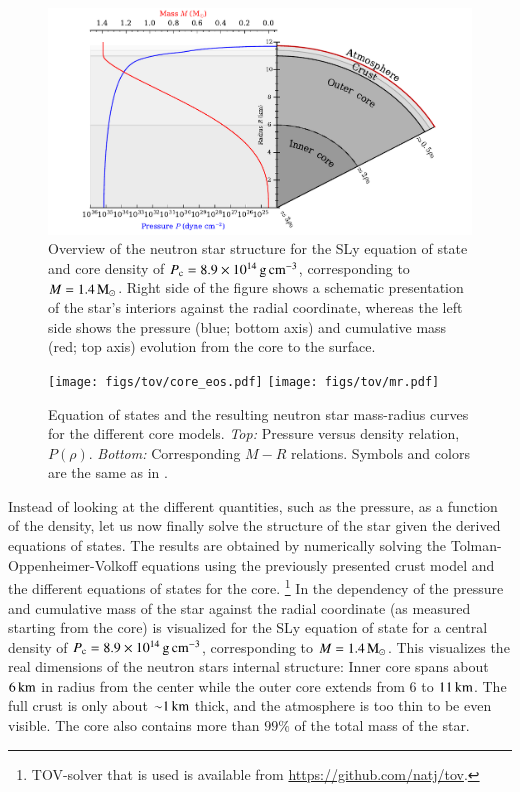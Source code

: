 \begin{figure}[t!]
\centering
\includegraphics[width=17cm]{figs/slice/slice.pdf}
\caption{\label{fig:slice}
Overview of the neutron star structure for the SLy equation of state and core density of $P_{\mathrm{c}} = 8.9 \times 10^{14}\, \mathrm{g}\,\mathrm{cm}^{-3}$, corresponding to $M=1.4\, \mathrm{M}_{\odot}$.
Right side of the figure shows a schematic presentation of the star's interiors against the radial coordinate, whereas the left side shows the pressure (blue; bottom axis) and cumulative mass (red; top axis) evolution from the core to the surface.
}
\end{figure}

\begin{figure}[t!]
\centering
\texttt{[image: figs/tov/core\_eos.pdf]}
\texttt{[image: figs/tov/mr.pdf]}
\caption{\label{fig:coreMR}
Equation of states and the resulting neutron star mass-radius curves for the different core models.
\emph{Top:} Pressure versus density relation, $P(\rho)$.
\emph{Bottom:} Corresponding $M-R$ relations.
Symbols and colors are the same as in .
}
\end{figure}

Instead of looking at the different quantities, such as the pressure, as a function of the density, let us now finally solve the structure of the star given the derived equations of states.
The results are obtained by numerically solving the Tolman-Oppenheimer-Volkoff equations using the previously presented crust model and the different equations of states for the core.%
\footnote{TOV-solver that is used is available from \url{https://github.com/natj/tov}.}
In  the dependency of the pressure and cumulative mass of the star against the radial coordinate (as measured starting from the core) is visualized for the SLy equation of state for a central density of $P_{\mathrm{c}} = 8.9 \times 10^{14}\, \mathrm{g}\,\mathrm{cm}^{-3}$, corresponding to $M=1.4\, \mathrm{M}_{\odot}$.
This visualizes the real dimensions of the neutron stars internal structure:
Inner core spans about $6\, \mathrm{km}$ in radius from the center while the outer core extends from $6$ to $11\, \mathrm{km}$.
The full crust is only about $\mathord{\sim} 1\, \mathrm{km}$ thick, and the atmosphere is too thin to be even visible.
The core also contains more than $99\%$ of the total mass of the star.



